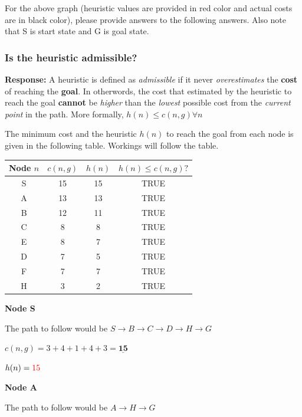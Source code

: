 \documentclass[12pt, letterpaper]{article}
\newcommand{\mybox}[1]{\par\noindent\colorbox{shadecolor}
{\parbox{\dimexpr\textwidth-2\fboxsep\relax}{#1}}}
\begin{document}
\mybox{For the above graph (heuristic values are provided in red color and actual costs are in black
color), please provide answers to the following answers. Also note that S is start state and G
is goal state.}

\subsubsection{Is the heuristic admissible?}

\textbf{Response:} A heuristic is defined as \textit{admissible} if it never \textit{overestimates} the \textbf{cost} of reaching the \textbf{goal}. 
In otherwords, the cost that estimated by the heuristic to reach the goal \textbf{cannot} be \textit{higher} than the \textit{lowest} possible cost from the \textit{current point} in the path.
More formally, $h(n)\leq c(n,g) \forall n$

The minimum cost and the heuristic $h(n)$ to reach the goal from each node is given in the following table.
Workings will follow the table.

\begin{center}
    \begin{tabular}{|c|c|c|c|} 
    \hline
    Node $n$ & $c(n,g)$ & $h(n)$ & $h(n)\leq c(n,g)?$ \\ 
    \hline
    S & 15 & 15 & TRUE\\
    \hline
    A & 13 & 13 & TRUE\\
    \hline
    B & 12 & 11 & TRUE\\
    \hline
    C & 8 & 8 & TRUE\\
    \hline
    E & 8 & 7 & TRUE\\
    \hline
    D & 7 & 5 & TRUE\\
    \hline
    F & 7 & 7 & TRUE\\
    \hline
    H & 3 & 2 & TRUE\\
    \hline
    \end{tabular}
\end{center}

\textbf{Node S}

The path to follow would be $S\rightarrow B\rightarrow C\rightarrow D\rightarrow H\rightarrow G$

$c(n,g)=3+4+1+4+3=\underline{\textbf{15}}$

$h(n)=\textcolor{red}{15}$

\textbf{Node A}

The path to follow would be $A\rightarrow H\rightarrow G$
\end{document}
